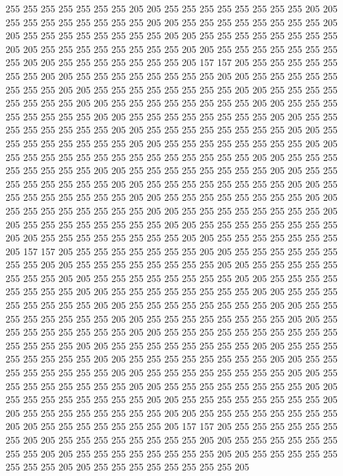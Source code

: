 255 255 255 255 255 255 255 205 205 255 255 255 255 255 255 255 255 205 205 255
255 255 255 255 255 255 255 205 205 255 255 255 255 255 255 255 255 205 205 255
255 255 255 255 255 255 255 205 205 255 255 255 255 255 255 255 255 205 205 255
255 255 255 255 255 255 255 205 205 255 255 255 255 255 255 255 255 205 205 255
255 255 255 255 255 255 205 157 157 205 255 255 255 255 255 255 255 205 205 255
255 255 255 255 255 255 255 205 205 255 255 255 255 255 255 255 255 205 205 255
255 255 255 255 255 255 255 205 205 255 255 255 255 255 255 255 255 205 205 255
255 255 255 255 255 255 255 205 205 255 255 255 255 255 255 255 255 205 205 255
255 255 255 255 255 255 255 205 205 255 255 255 255 255 255 255 255 205 205 255
255 255 255 255 255 255 255 205 205 255 255 255 255 255 255 255 255 205 205 255
255 255 255 255 255 255 255 205 205 255 255 255 255 255 255 255 255 255 255 255
255 255 255 205 205 255 255 255 255 255 255 255 255 205 205 255 255 255 255 255
255 255 255 205 205 255 255 255 255 255 255 255 255 205 205 255 255 255 255 255
255 255 255 205 205 255 255 255 255 255 255 255 255 205 205 255 255 255 255 255
255 255 255 205 205 255 255 255 255 255 255 255 255 205 205 255 255 255 255 255
255 255 255 205 205 255 255 255 255 255 255 255 255 205 205 255 255 255 255 255
255 255 255 205 205 255 255 255 255 255 255 255 255 205 205 255 255 255 255 255
255 255 205 157 157 205 255 255 255 255 255 255 255 205 205 255 255 255 255 255
255 255 255 205 205 255 255 255 255 255 255 255 255 205 205 255 255 255 255 255
255 255 255 205 205 255 255 255 255 255 255 255 255 205 205 255 255 255 255 255
255 255 255 205 205 255 255 255 255 255 255 255 255 205 205 255 255 255 255 255
255 255 255 205 205 255 255 255 255 255 255 255 255 205 205 255 255 255 255 255
255 255 255 205 205 255 255 255 255 255 255 255 255 205 205 255 255 255 255 255
255 255 255 205 205 255 255 255 255 255 255 255 255 255 255 255 255 255 255 205
205 255 255 255 255 255 255 255 255 205 205 255 255 255 255 255 255 255 255 205
205 255 255 255 255 255 255 255 255 205 205 255 255 255 255 255 255 255 255 205
205 255 255 255 255 255 255 255 255 205 205 255 255 255 255 255 255 255 255 205
205 255 255 255 255 255 255 255 255 205 205 255 255 255 255 255 255 255 255 205
205 255 255 255 255 255 255 255 255 205 205 255 255 255 255 255 255 255 255 205
205 255 255 255 255 255 255 255 255 205 205 255 255 255 255 255 255 255 205 157
157 205 255 255 255 255 255 255 255 205 205 255 255 255 255 255 255 255 255 205
205 255 255 255 255 255 255 255 255 205 205 255 255 255 255 255 255 255 255 205
205 255 255 255 255 255 255 255 255 205 205 255 255 255 255 255 255 255 255 205
